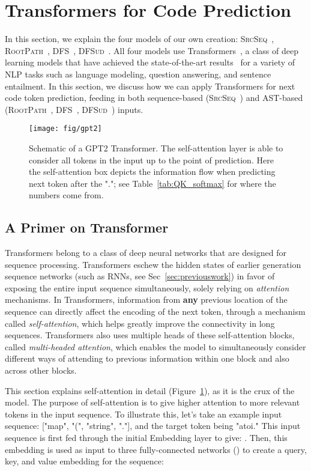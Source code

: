 \documentclass[nonacm, sigconf]{acmart}
\newcommand{\abbr}[1]{\textsc{#1}~}
\newcommand{\SrcSeq}{\abbr{SrcSeq}} \newcommand{\SrcRNN}{\abbr{SrcRNN}} \newcommand{\LeafSeq}{\abbr{LeafSeq}} \newcommand{\RootPath}{\abbr{RootPath}} \newcommand{\LeafTokens}{\abbr{LeafTokens}} \newcommand{\DFS}{\abbr{DFS}} \newcommand{\TreeRel}{\abbr{DFS{ud}}} \newcommand{\TreeReli}{\abbr{DFS{ud+}}}
\begin{document}
\section{Transformers for Code Prediction}
\label{sec:models}

In this section, we explain the four models of our own creation: \SrcSeq, \RootPath, \DFS, \TreeRel. All four models use Transformers~\citep{vaswani2017attention}, a class of deep learning models that have achieved the state-of-the-art results~\citep{devlin2018bert,dong2019unified-unilm,radford2019language-gpt2} for a variety of NLP tasks such as language modeling, question answering, and sentence entailment. In this section, we discuss how we can apply Transformers for next code token prediction, feeding in both sequence-based (\SrcSeq) and AST-based (\RootPath, \DFS, \TreeRel) inputs.


\begin{figure}[t]
    \centering
    \texttt{[image: fig/gpt2]}
    \caption{Schematic of a GPT2 Transformer. The self-attention layer is able to consider all tokens in the input up to the point of prediction. Here the self-attention box depicts the information flow when predicting next token after the "."; see Table~\ref{tab:QK_softmax} for where the numbers come from.}
    \label{fig:gpt2}
\end{figure}


\subsection{A Primer on Transformer}
Transformers belong to a class of deep neural networks that are designed for sequence processing.  Transformers eschew the hidden states of earlier generation sequence networks (such as RNNs, see Sec~\ref{sec:previouswork}) in favor of exposing the entire input sequence simultaneously, solely relying on \textit{attention} mechanisms.  In Transformers, information from \textbf{any} previous location of the sequence can directly affect the encoding of the next token, through a mechanism called \textit{self-attention}, which helps greatly improve the connectivity in long sequences.  Transformers also uses multiple heads of these self-attention blocks, called \textit{multi-headed attention}, which enables the model to simultaneously consider different ways of attending to previous information within one block and also across other blocks. 

This section explains self-attention in detail (Figure~\ref{fig:gpt2}), as it is the crux of the model. 
The purpose of self-attention is to give higher attention to more relevant tokens in the input sequence. 
To illustrate this, let's take an example input sequence: ["map", "(", "string", "."], and the target token being "atoi." This input sequence is first fed through the initial Embedding layer to give: . Then, this embedding is used as input to three fully-connected networks () to create a query, key, and value embedding for the sequence: 
\end{document}
